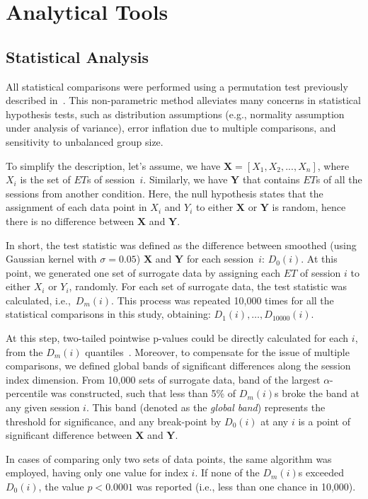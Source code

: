 \section{Analytical Tools} \label{ch:methods:analytics}

\subsection{Statistical Analysis}
All statistical comparisons were performed using a permutation test previously described in~\cite{Fujisawa2008NN}.
This non-parametric method alleviates many concerns in statistical hypothesis tests, such as distribution assumptions (e.g., normality assumption under analysis of variance), error inflation due to multiple comparisons, and sensitivity to unbalanced group size.
\par
To simplify the description, let's assume, we have ${\mathbf{X}=[X_1, X_2,...,X_n]}$, where $X_i$ is the set of $ET$s of session~$i$.
Similarly, we have $\mathbf{Y}$ that contains $ET$s of all the sessions from another condition.
Here, the null hypothesis states that the assignment of each data point in $X_i$ and $Y_i$ to either $\mathbf{X}$ or $\mathbf{Y}$ is random, hence there is no difference between $\mathbf{X}$ and $\mathbf{Y}$.
\par
In short, the test statistic was defined as the difference between smoothed (using Gaussian kernel with $\sigma =0.05$) $\mathbf{X}$ and $\mathbf{Y}$ for each session~$i$: $D_0(i)$.
At this point, we generated one set of surrogate data by assigning each $ET$ of session $i$ to either $X_i$ or $Y_i$, randomly.
For each set of surrogate data, the test statistic was calculated, i.e.,~$D_m(i)$.
This process was repeated 10,000 times for all the statistical comparisons in this study, obtaining: $D_1(i),\ldots,D_{10000}(i)$.
\par
At this step, two-tailed pointwise p-values could be directly calculated for each $i$, from the $D_m(i)$ quantiles~\cite[see][]{Fujisawa2008NN}.
Moreover, to compensate for the issue of multiple comparisons, we defined global bands of significant differences along the session index dimension.
From 10,000 sets of surrogate data, band of the largest $\alpha$-percentile was constructed, such that less than 5\% of $D_m(i)$s broke the band at any given session $i$.
This band (denoted as the \textit{global band}) represents the threshold for significance, and any break-point by $D_0(i)$ at any $i$ is a point of significant difference between $\mathbf{X}$ and $\mathbf{Y}$.
\par
In cases of comparing only two sets of data points, the same algorithm was employed, having only one value for index $i$.
If none of the $D_m(i)$s exceeded $D_0(i)$, the value $p<0.0001$ was reported (i.e., less than one chance in 10,000).
